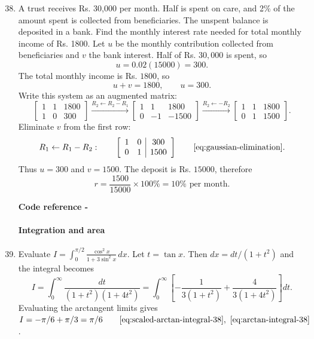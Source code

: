\begin{enumerate}[label={},leftmargin=0pt]
\begin{enumerate}[label={},leftmargin=4mm,itemsep=9pt]
\setcounter{enumii}{37}
\setcounter{equation}{0}
\item[\textbf{1.2.37}] A trust receives Rs. 30,000 per month. Half is spent on care, and 2\% of the amount spent is collected from beneficiaries. The unspent balance is deposited in a bank. Find the monthly interest rate needed for total monthly income of Rs. 1800.
\solution Let $u$ be the monthly contribution collected from beneficiaries and $v$ the bank interest. Half of Rs. $30,000$ is spent, so
\[
u=0.02(15000)=300.
\]
The total monthly income is Rs. $1800$, so
\[
u+v=1800,\qquad u=300.
\]
Write this system as an augmented matrix:
\[
\left[\begin{array}{cc|c}1&1&1800\\1&0&300\end{array}\right]
\xrightarrow{R_2\leftarrow R_2-R_1}
\left[\begin{array}{cc|c}1&1&1800\\0&-1&-1500\end{array}\right]
\xrightarrow{R_2\leftarrow -R_2}
\left[\begin{array}{cc|c}1&1&1800\\0&1&1500\end{array}\right].
\]
Eliminate $v$ from the first row:
\[
R_1\leftarrow R_1-R_2:\qquad
\left[\begin{array}{cc|c}1&0&300\\0&1&1500\end{array}\right]\qquad\eqref{eq:gaussian-elimination}.
\]
Thus $u=300$ and $v=1500$. The deposit is Rs. $15000$, therefore
\[
r=\frac{1500}{15000}\times100\%=10\%\text{ per month}.
\]
\par\smallskip
\noindent\textbf{Code reference -}
\par\noindent{}
\par\smallskip



\paragraph*{Integration and area}
\setcounter{enumii}{38}
\setcounter{equation}{0}
\item[\textbf{1.2.38}] Evaluate $\displaystyle I=\int_0^{\pi/2}\frac{\cos^2x}{1+3\sin^2x}\,dx$.
\solution Let $t=\tan x$. Then $dx=dt/(1+t^2)$ and the integral becomes
\[
I=\int_0^\infty\frac{dt}{(1+t^2)(1+4t^2)}=\int_0^\infty\left[-\frac1{3(1+t^2)}+\frac4{3(1+4t^2)}\right]dt.
\]
Evaluating the arctangent limits gives $I=-\pi/6+\pi/3=\pi/6\qquad\eqref{eq:scaled-arctan-integral-38},\ \eqref{eq:arctan-integral-38}$.


\end{enumerate}
\end{enumerate}
